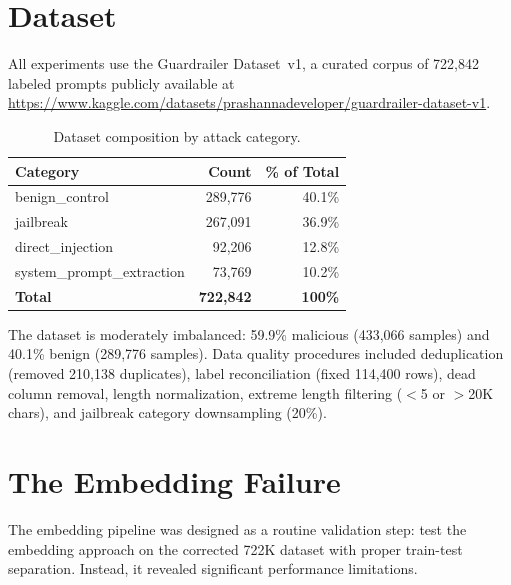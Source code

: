 \documentclass[12pt,a4paper]{article}
\begin{document}
\section{Dataset}\label{sec:dataset}

All experiments use the Guardrailer Dataset~v1, a curated corpus of 722,842 labeled prompts publicly available at \url{https://www.kaggle.com/datasets/prashannadeveloper/guardrailer-dataset-v1}.

\begin{table}[H]
\centering
\caption{Dataset composition by attack category.}
\label{tab:dataset_overview}
\begin{tabular}{@{}lrr@{}}
\toprule
\textbf{Category} & \textbf{Count} & \textbf{\% of Total} \\
\midrule
benign\_control & 289,776 & 40.1\% \\
jailbreak & 267,091 & 36.9\% \\
direct\_injection & 92,206 & 12.8\% \\
system\_prompt\_extraction & 73,769 & 10.2\% \\
\midrule
\textbf{Total} & \textbf{722,842} & \textbf{100\%} \\
\bottomrule
\end{tabular}
\end{table}

The dataset is moderately imbalanced: 59.9\% malicious (433,066 samples) and 40.1\% benign (289,776 samples). Data quality procedures included deduplication (removed 210,138 duplicates), label reconciliation (fixed 114,400 rows), dead column removal, length normalization, extreme length filtering ($<$5 or $>$20K chars), and jailbreak category downsampling (20\%).

\section{The Embedding Failure}\label{sec:phase6}

The embedding pipeline was designed as a routine validation step: test the embedding approach on the corrected 722K dataset with proper train-test separation. Instead, it revealed significant performance limitations.
\end{document}

